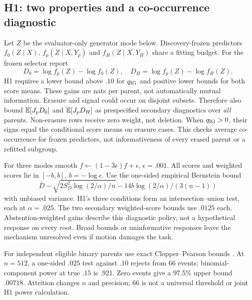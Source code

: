 \subsection{H1: two properties and a co-occurrence diagnostic}
Let $Z$ be the evaluator-only generator mode below. Discovery-frozen predictors $f_0(Z\mid X)$, $f_p(Z\mid X,Y_p)$ and $f_H(Z\mid X,Y_H)$ share a fitting budget. For the frozen selector report
\begin{equation}
D_0=\log f_p(Z)-\log f_0(Z),\quad
D_H=\log f_p(Z)-\log f_H(Z).
\end{equation}
H1 requires a lower bound above $.10$ for $q_{\rm IG}$ and positive lower bounds for both score means. These gains are nats per parent, not automatically mutual information. Erasure and signal could occur on disjoint subsets. Therefore also bound $\mathbb E[J_pD_0]$ and $\mathbb E[J_pD_H]$ as prespecified secondary diagnostics over \emph{all} parents. Non-erasure rows receive zero weight, not deletion. When $q_{\rm IG}>0$, their signs equal the conditional score means on erasure cases. This checks average co-occurrence for frozen predictors, not informativeness of every erased parent or a refitted subgroup.

For three modes smooth $f\leftarrow(1-3\epsilon)f+\epsilon$, $\epsilon=.001$. All scores and weighted scores lie in $[-b,b]$, $b=-\log\epsilon$. Use the one-sided empirical Bernstein bound \citep{maurer2009}
\begin{equation}
\bar D-\sqrt{2S_D^2\log(2/\alpha)/n}
-14b\log(2/\alpha)/(3(n-1))\label{eq:eb}
\end{equation}
with unbiased variance. H1's three conditions form an intersection--union test, each at $\alpha=.025$. The two secondary weighted-score bounds use $.0125$ each. Abstention-weighted gains describe this diagnostic policy, not a hypothetical response on every root. Broad bounds or uninformative responses leave the mechanism unresolved even if motion damages the task.

For independent eligible binary parents use exact Clopper--Pearson bounds \citep{clopper1934}. At $n=512$, a one-sided $.025$ test against $.10$ rejects from 66 events; binomial-component power at true $.15$ is $.921$. Zero events give a 97.5\% upper bound $.00718$. Attrition changes $n$ and precision; 66 is not a universal threshold or joint H1 power calculation.

